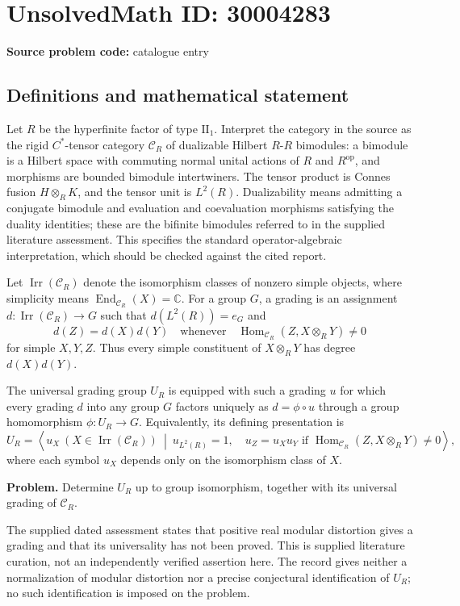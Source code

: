 \documentclass[11pt]{article}
\newcommand{\C}{\mathbb{C}}
\begin{document}
\section*{UnsolvedMath ID: 30004283}
\textbf{Source problem code:} catalogue entry
\subsection{Definitions and mathematical statement}
Let \(R\) be the hyperfinite factor of type \(\mathrm{II}_1\). Interpret the category in the source as the rigid \(C^*\)-tensor category \(\mathcal C_R\) of dualizable Hilbert \(R\)-\(R\) bimodules: a bimodule is a Hilbert space with commuting normal unital actions of \(R\) and \(R^{\mathrm{op}}\), and morphisms are bounded bimodule intertwiners. The tensor product is Connes fusion \(H\otimes_R K\), and the tensor unit is \(L^2(R)\). Dualizability means admitting a conjugate bimodule and evaluation and coevaluation morphisms satisfying the duality identities; these are the bifinite bimodules referred to in the supplied literature assessment. This specifies the standard operator-algebraic interpretation, which should be checked against the cited report.

Let \(\operatorname{Irr}(\mathcal C_R)\) denote the isomorphism classes of nonzero simple objects, where simplicity means \(\operatorname{End}_{\mathcal C_R}(X)=\C\). For a group \(G\), a grading is an assignment \(d:\operatorname{Irr}(\mathcal C_R)\to G\) such that \(d(L^2(R))=e_G\) and
\[
d(Z)=d(X)d(Y)
\quad\text{whenever}\quad
\operatorname{Hom}_{\mathcal C_R}(Z,X\otimes_R Y)\ne 0
\]
for simple \(X,Y,Z\). Thus every simple constituent of \(X\otimes_R Y\) has degree \(d(X)d(Y)\).

The universal grading group \(U_R\) is equipped with such a grading \(u\) for which every grading \(d\) into any group \(G\) factors uniquely as \(d=\phi\circ u\) through a group homomorphism \(\phi:U_R\to G\). Equivalently, its defining presentation is
\[
U_R=\left\langle
u_X\ (X\in\operatorname{Irr}(\mathcal C_R))
\ \middle|\ 
u_{L^2(R)}=1,\quad
u_Z=u_Xu_Y\text{ if }\operatorname{Hom}_{\mathcal C_R}(Z,X\otimes_R Y)\ne0
\right\rangle,
\]
where each symbol \(u_X\) depends only on the isomorphism class of \(X\).

\textbf{Problem.} Determine \(U_R\) up to group isomorphism, together with its universal grading of \(\mathcal C_R\).

The supplied dated assessment states that positive real modular distortion gives a grading and that its universality has not been proved. This is supplied literature curation, not an independently verified assertion here. The record gives neither a normalization of modular distortion nor a precise conjectural identification of \(U_R\); no such identification is imposed on the problem.
\end{document}
